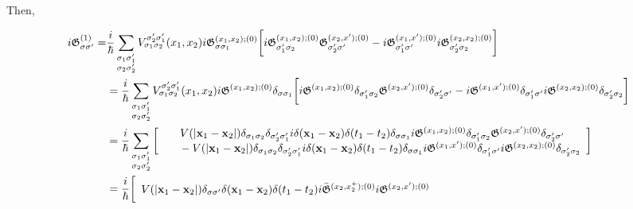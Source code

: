 Then,

\begin{equation}
    \begin{split}
         i \mathfrak{G}^{(1)}_{\sigma \sigma'} =& \frac{i}{\hbar} \sum_{\substack{\sigma_1 \sigma'_1 \\
        \sigma_2 \sigma'_2}} V_{\sigma_1\sigma_2}^{\sigma'_2\sigma'_1}(x_1,x_2) i \mathfrak{G}^{(x_1, x_2); (0)}_{\sigma\sigma_1} \bigg[ i \mathfrak{G}^{(x_1,x_2); (0)}_{\sigma'_1\sigma_2}
        \mathfrak{G}^{(x_2, x'); (0)}_{\sigma'_2\sigma'} 
         -
        i \mathfrak{G}^{(x_1,x'); (0)}_{\sigma'_1\sigma'} 
        i \mathfrak{G}^{(x_2, x_2); (0)}_{\sigma'_2\sigma_2} \bigg] \\
        &=\frac{i}{\hbar} \sum_{\substack{\sigma_1 \sigma'_1 \\
        \sigma_2 \sigma'_2}} V_{\sigma_1\sigma_2}^{\sigma'_2\sigma'_1}(x_1,x_2) i \mathfrak{G}^{(x_1, x_2); (0)} \delta_{\sigma \sigma_1} \bigg[ i \mathfrak{G}^{(x_1,x_2); (0)} \delta_{\sigma'_1\sigma_2}
        \mathfrak{G}^{(x_2, x'); (0)} \delta_{\sigma'_2\sigma'} 
         -
        i \mathfrak{G}^{(x_1,x'); (0)}\delta_{\sigma'_1\sigma'} 
        i \mathfrak{G}^{(x_2, x_2); (0)}\delta_{\sigma'_2\sigma_2} \bigg] \\
        &=\frac{i}{\hbar} \sum_{\substack{\sigma_1 \sigma'_1 \\
        \sigma_2 \sigma'_2}} \bigg[\begin{array}{cc}
            V(|{\bf x}_1 - {\bf x}_2|)\delta_{\sigma_1\sigma_2} \delta_{\sigma'_2\sigma'_1} i \delta({\bf x}_1 - {\bf x}_2) \delta(t_1-t_2)\delta_{\sigma \sigma_1}i \mathfrak{G}^{(x_1,x_2); (0)} \delta_{\sigma'_1\sigma_2}
            \mathfrak{G}^{(x_2, x'); (0)} \delta_{\sigma'_2\sigma'} \\
             \textnormal{ } \textnormal{ } \textnormal{ } \textnormal{ }       - V(|{\bf x}_1 - {\bf x}_2|)\delta_{\sigma_1\sigma_2} \delta_{\sigma'_2\sigma'_1} i \delta({\bf x}_1 - {\bf x}_2) \delta(t_1-t_2)\delta_{\sigma \sigma_1}
                i \mathfrak{G}^{(x_1,x'); (0)}\delta_{\sigma'_1\sigma'} 
                i \mathfrak{G}^{(x_2, x_2); (0)}\delta_{\sigma'_2\sigma_2} 
        \end{array} \bigg] \\
        &= \frac{i}{\hbar} \bigg[\begin{array}{cc}
            V(|{\bf x}_1 - {\bf x}_2|)\delta_{\sigma \sigma'} \delta({\bf x}_1 - {\bf x}_2) \delta(t_1-t_2) i \bar{\mathfrak{G}}^{(x_2,x_2^+); (0)} 
            i \mathfrak{G}^{(x_2, x'); (0)} \\

\end{array}
\end{split}
\end{equation}
